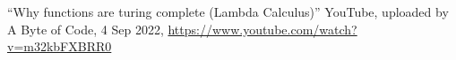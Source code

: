 \begin{thebibliography}{99}
	
	
	``Why functions are turing complete (Lambda Calculus)'' YouTube, uploaded by A Byte of Code, 4 Sep 2022, \url{https://www.youtube.com/watch?v=m32kbFXBRR0}
	
\end{thebibliography}